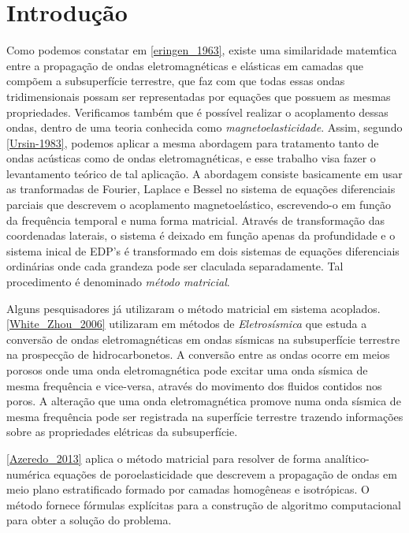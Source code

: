 \chapter{Introdu\c{c}\~ao}
Como podemos constatar em \ref{eringen_1963}, existe uma similaridade matem\'tica entre a propaga\c{c}\~ao de ondas eletromagn\'eticas e el\'asticas em camadas que comp\~oem a subsuperf\'icie terrestre, que faz com que todas essas ondas tridimensionais possam ser representadas por equa\c{c}\~oes que possuem as mesmas propriedades. Verificamos tamb\'em que \'e poss\'ivel realizar o acoplamento dessas ondas, dentro de uma teoria conhecida como \textit{magnetoelasticidade}. Assim, segundo \ref{Ursin-1983}, podemos aplicar a mesma abordagem para tratamento tanto de ondas ac\'usticas como de ondas eletromagn\'eticas, e esse trabalho visa fazer o levantamento te\'orico de tal aplica\c{c}\~ao. A abordagem consiste basicamente em usar as tranformadas de Fourier, Laplace e Bessel no sistema de equa\c{c}\~oes diferenciais parciais que descrevem o acoplamento magnetoel\'astico, escrevendo-o em fun\c{c}\~ao da frequ\^encia temporal e numa forma matricial. Atrav\'es de transforma\c{c}\~ao das coordenadas laterais, o sistema \'e deixado em fun\c{c}\~ao apenas da profundidade e o sistema inical de EDP's \'e transformado em dois sistemas de equa\c{c}\~oes diferenciais ordin\'arias onde cada grandeza pode ser claculada separadamente. Tal procedimento \'e denominado \textit{m\'etodo matricial}.

Alguns pesquisadores j\'a utilizaram o m\'etodo matricial em sistema acoplados. \ref{White_Zhou_2006} utilizaram em m\'etodos de \textit{Eletros\'ismica} que estuda a convers\~ao de ondas eletromagn\'eticas em ondas s\'ismicas na subsuperf\'icie terrestre na prospec\c{c}\~ao de hidrocarbonetos. A convers\~ao entre as ondas ocorre em meios porosos onde uma onda eletromagn\'etica pode excitar uma onda s\'ismica de mesma frequ\^encia e vice-versa, atrav\'es do movimento dos fluidos contidos nos poros. A altera\c{c}\~ao que uma onda eletromagn\'etica promove numa onda s\'ismica de mesma frequ\^encia pode ser registrada na superf\'icie terrestre trazendo informa\c{c}\~oes sobre as propriedades el\'etricas da subsuperf\'icie. 

\ref{Azeredo_2013} aplica o m\'etodo matricial para resolver de forma anal\'itico-num\'erica equa\c{c}\~oes de poroelasticidade que descrevem a propaga\c{c}\~ao de ondas em meio plano estratificado formado por camadas homog\^eneas e isotr\'opicas. O m\'etodo fornece f\'ormulas expl\'icitas para a constru\c{c}\~ao de algoritmo computacional  para obter a solu\c{c}\~ao do problema.